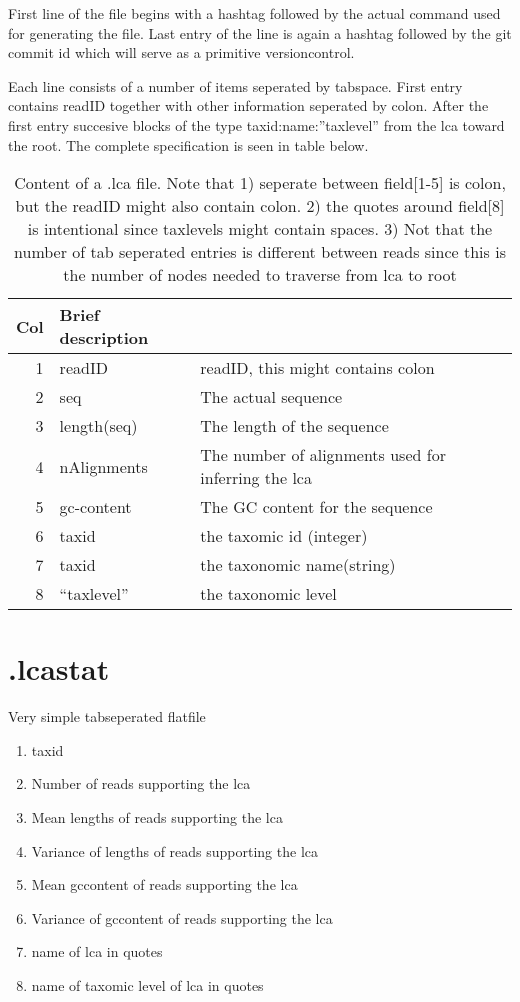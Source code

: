 \documentclass[10pt]{article}
\begin{document}
First line of the file begins with a hashtag followed by the actual command used for generating the file. Last entry of the line is again a hashtag followed by the git commit id which will serve as a primitive versioncontrol.

Each line consists of a number of items seperated by tabspace. First entry contains readID together with other information seperated by colon. After the first entry succesive blocks of the type taxid:name:''taxlevel'' from the lca toward the root. The complete specification is seen in table below.

\begin{table}[h]
\begin{tabular}{rll}
  \hline
  {\bf Col} & {\bf Brief description} \\
  \hline
  1 & {\sf readID} & readID, this might contains colon\\
  2 & {\sf seq} & The actual sequence\\
  3 & {\sf length(seq)} & The length of the sequence\\
  4 & {\sf nAlignments} & The number of alignments used for inferring the lca\\
  5 & {\sf gc-content} & The GC content for the sequence\\\hline\hline
  6 & {\sf taxid} & the taxomic id (integer)\\
  7 & {\sf taxid} & the taxonomic name(string)\\
  8 & {\sf ``taxlevel''} & the taxonomic level\\\hline\hline      
\end{tabular}\label{tab2}
\caption{Content of a .lca file. Note that 1) seperate between field[1-5] is colon, but the readID might also contain colon. 2) the quotes around field[8] is intentional since taxlevels might contain spaces. 3) Not that the number of tab seperated entries is different between reads since this is the number of nodes needed to traverse from lca to root}
\end{table}
\section{.lcastat}
Very simple tabseperated flatfile
\begin{enumerate}
\item taxid
\item Number of reads supporting the lca
\item Mean lengths of reads supporting the lca
\item Variance of lengths of reads supporting the lca
\item Mean gccontent of reads supporting the lca
\item Variance of gccontent of reads supporting the lca
\item name of lca in quotes
\item name of taxomic level of lca in quotes
\end{enumerate}
\end{document}
